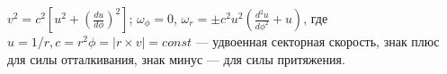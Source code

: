 $v^2=c^2[u^2+(\frac{du}{d\phi})^2]$; $\omega_{\phi}=0$, $\omega_{r}=\pm c^2u^2(\frac{d^2u}{d\phi^2}+u)$,
где $u=1/r, c=r^2\phi=|r\times v|=const$ --- удвоенная секторная скорость, знак плюс для силы отталкивания, знак минус --- 
для силы притяжения.
